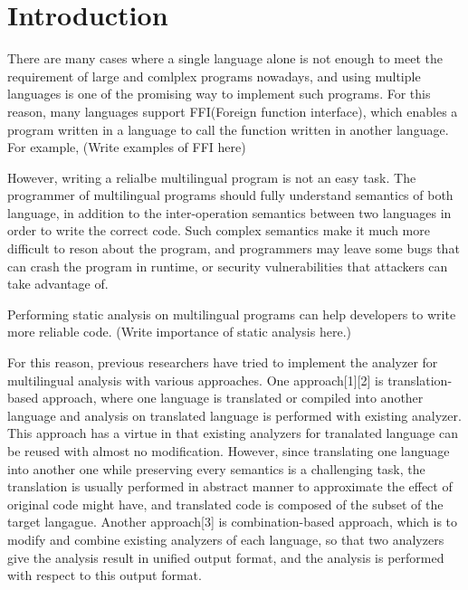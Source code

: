\section{Introduction}

There are many cases where a single language alone is not enough to meet the
requirement of large and comlplex programs nowadays, and using multiple
languages is one of the promising way to implement such programs. For this
reason, many languages support FFI(Foreign function interface), which enables a
program written in a language to call the function written in another language.
For example, (Write examples of FFI here)

However, writing a relialbe multilingual program is not an easy task. The
programmer of multilingual programs should fully understand semantics of both
language, in addition to the inter-operation semantics between two languages in
order to write the correct code.  Such complex semantics make it much more
difficult to reson about the program, and programmers may leave some bugs that
can crash the program in runtime, or security vulnerabilities that attackers
can take advantage of.

Performing static analysis on multilingual programs can help developers to
write more reliable code. (Write importance of static analysis here.)

For this reason, previous researchers have tried to implement the analyzer for
multilingual analysis with various approaches.  One approach[1][2] is
translation-based approach, where one language is translated or compiled into
another language and analysis on translated language is performed with existing
analyzer.  This approach has a virtue in that existing analyzers for tranalated
language can be reused with almost no modification.  However, since translating
one language into another one while preserving every semantics is a challenging
task, the translation is usually performed in abstract manner to approximate
the effect of original code might have, and translated code is composed of the
subset of the target langague. Another approach[3] is combination-based
approach, which is to modify and combine existing analyzers of each language,
so that two analyzers give the analysis result in unified output format, and
the analysis is performed with respect to this output format.


